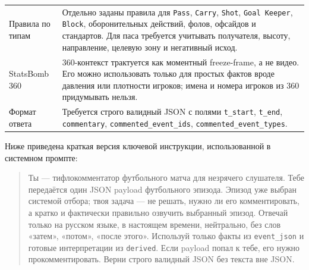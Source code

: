\begin{longtable}{p{}p{}}
Правила по типам & Отдельно заданы правила для \texttt{Pass}, \texttt{Carry}, \texttt{Shot}, \texttt{Goal Keeper}, \texttt{Block}, оборонительных действий, фолов, офсайдов и стандартов. Для паса требуется учитывать получателя, высоту, направление, целевую зону и негативный исход. \\
StatsBomb 360 & 360-контекст трактуется как моментный freeze-frame, а не видео. Его можно использовать только для простых фактов вроде давления или плотности игроков; имена и номера игроков из 360 придумывать нельзя. \\
Формат ответа & Требуется строго валидный JSON с полями \texttt{t\_start}, \texttt{t\_end}, \texttt{commentary}, \texttt{commented\_event\_ids}, \texttt{commented\_event\_types}. \\
\end{longtable}

Ниже приведена краткая версия ключевой инструкции, использованной в системном промпте:

\begin{quote}\small
Ты --- тифлокомментатор футбольного матча для незрячего слушателя. Тебе передаётся один JSON payload футбольного эпизода. Эпизод уже выбран системой отбора; твоя задача --- не решать, нужно ли его комментировать, а кратко и фактически правильно озвучить выбранный эпизод. Отвечай только на русском языке, в настоящем времени, нейтрально, без слов «затем», «потом», «после этого». Используй только факты из \texttt{event\_json} и готовые интерпретации из \texttt{derived}. Если payload попал к тебе, его нужно прокомментировать. Верни строго валидный JSON без текста вне JSON.
\end{quote}
